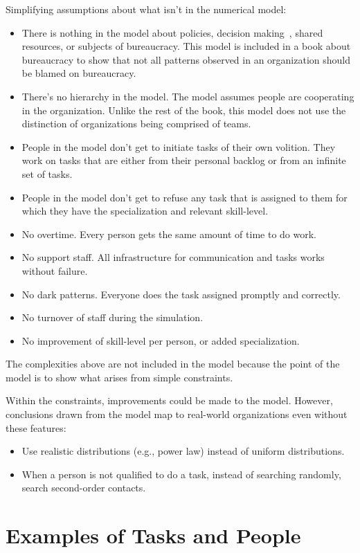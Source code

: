 Simplifying assumptions about what isn't in the numerical model:
\begin{itemize}
    \item There is nothing in the model about policies, decision making~\cite{2009_Klimek}, shared resources, or subjects of bureaucracy. This model is included in a book about bureaucracy to show that not all patterns observed in an organization should be blamed on bureaucracy. 
    \item There's no hierarchy in the model. The model assumes people are cooperating in the organization. Unlike the rest of the book, this model does not use the distinction of organizations being comprised of teams.
    \item People in the model don't get to initiate tasks of their own volition. They work on tasks that are either from their personal backlog or from an infinite set of tasks.
    \item People in the model don't get to refuse any task that is assigned to them for which they have the specialization and relevant skill-level.
    \item No overtime. Every person gets the same amount of time to do work.
    \item No support staff. All infrastructure for communication and tasks works without failure.
    \item No dark patterns. Everyone does the task assigned promptly and correctly.
    \item No turnover of staff during the simulation.
    \item No improvement of skill-level per person, or added specialization.
\end{itemize}
The complexities above are not included in the model because the point of the model is to show what arises from simple constraints. 

Within the constraints, improvements could be made to the model.  %
However,  conclusions drawn from the model map to real-world organizations even without these features: 
\begin{itemize}
    \item Use realistic distributions (e.g., power law) instead of uniform distributions.
    \item When a person is not qualified to do a task, instead of searching randomly, search second-order contacts.
\end{itemize}

\section{Examples of Tasks and People}

